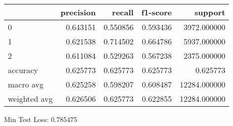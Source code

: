 \begin{tabular}{lrrrr}
\toprule
{} &  precision &    recall &  f1-score &       support \\
\midrule
0            &   0.643151 &  0.550856 &  0.593436 &   3972.000000 \\
1            &   0.621538 &  0.714502 &  0.664786 &   5937.000000 \\
2            &   0.611084 &  0.529263 &  0.567238 &   2375.000000 \\
accuracy     &   0.625773 &  0.625773 &  0.625773 &      0.625773 \\
macro avg    &   0.625258 &  0.598207 &  0.608487 &  12284.000000 \\
weighted avg &   0.626506 &  0.625773 &  0.622855 &  12284.000000 \\
\bottomrule
\end{tabular}

Min Test Loss: 0.785475